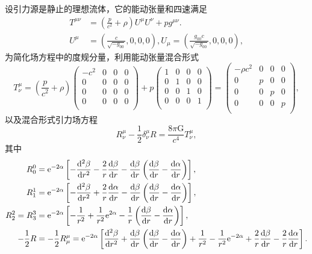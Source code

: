 \documentclass[11pt, a4paper, oneside, onecolumn]{ctexart}
\numberwithin{equation}{subsection}
\begin{document}
设引力源是静止的理想流体，它的能动张量和四速满足
\begin{align}
T^{\mu\nu}&=\left(\frac{p}{c^{2}}+\rho\right)U^{\mu}U^{\nu}+pg^{\mu\nu}.\\
U^{\mu}&=\left(\frac{c}{\sqrt{-g_{00}}},0,0,0\right),U_{\mu}=\left(\frac{g_{00}c}{\sqrt{-g_{00}}},0,0,0\right),
\end{align}
为简化场方程中的度规分量，利用能动张量混合形式
\begin{equation}
T^{\mu}_{\nu}=\left(\frac{p}{c^{2}}+\rho\right)
\begin{pmatrix}
-c^{2} & 0 & 0 & 0\\
0 & 0 & 0 & 0\\
0 & 0 & 0 & 0\\
0 & 0 & 0 & 0\\
\end{pmatrix}
+p\begin{pmatrix}
1 & 0 & 0 & 0\\
0 & 1 & 0 & 0\\
0 & 0 & 1 & 0\\
0 & 0 & 0 & 1\\
\end{pmatrix}
=\begin{pmatrix}
-\rho c^{2} & 0 & 0 & 0\\
0 & p & 0 & 0\\
0 & 0 & p & 0\\
0 & 0 & 0 & p\\
\end{pmatrix},
\end{equation}
以及混合形式引力场方程
\begin{equation}
R^{\mu}_{\nu}-\frac{1}{2}\delta{}^{\mu}_{\nu}R=\frac{8\pi\mathrm{G}}{c^{4}}T^{\mu}_{\nu},
\end{equation}
其中
\begin{align}
R^{0}_{0}&=\mathrm{e}^{-2\alpha}\left[-\frac{\mathrm{d}^{2}\beta}{\mathrm{d}r^{2}}-\frac{2}{r}\frac{\mathrm{d}\beta}{\mathrm{d}r}-\frac{\mathrm{d}\beta}{\mathrm{d}r}\left(\frac{\mathrm{d}\beta}{\mathrm{d}r}-\frac{\mathrm{d}\alpha}{\mathrm{d}r}\right)\right],\notag\\
R^{1}_{1}&=\mathrm{e}^{-2\alpha}\left[-\frac{\mathrm{d}^{2}\beta}{\mathrm{d}r^{2}}+\frac{2}{r}\frac{\mathrm{d}\alpha}{\mathrm{d}r}-\frac{\mathrm{d}\beta}{\mathrm{d}r}\left(\frac{\mathrm{d}\beta}{\mathrm{d}r}-\frac{\mathrm{d}\alpha}{\mathrm{d}r}\right)\right],\notag\\
R^{2}_{2}=R^{3}_{3}&=\mathrm{e}^{-2\alpha}\left[-\frac{1}{r^{2}}+\frac{1}{r^{2}}\mathrm{e}^{2\alpha}-\frac{1}{r}\left(\frac{\mathrm{d}\beta}{\mathrm{d}r}-\frac{\mathrm{d}\alpha}{\mathrm{d}r}\right)\right],\notag\\
-\frac{1}{2}R&=-\frac{1}{2}R^{\mu}_{\mu}=\mathrm{e}^{-2\alpha}\left[\frac{\mathrm{d}^{2}\beta}{\mathrm{d}r^{2}}+\frac{\mathrm{d}\beta}{\mathrm{d}r}\left(\frac{\mathrm{d}\beta}{\mathrm{d}r}-\frac{\mathrm{d}\alpha}{\mathrm{d}r}\right)+\frac{1}{r^{2}}-\frac{1}{r^{2}}\mathrm{e}^{-2\alpha}+\frac{2}{r}\frac{\mathrm{d}\beta}{\mathrm{d}r}-\frac{2}{r}\frac{\mathrm{d}\alpha}{\mathrm{d}r}\right].\notag
\end{align}
\end{document}
